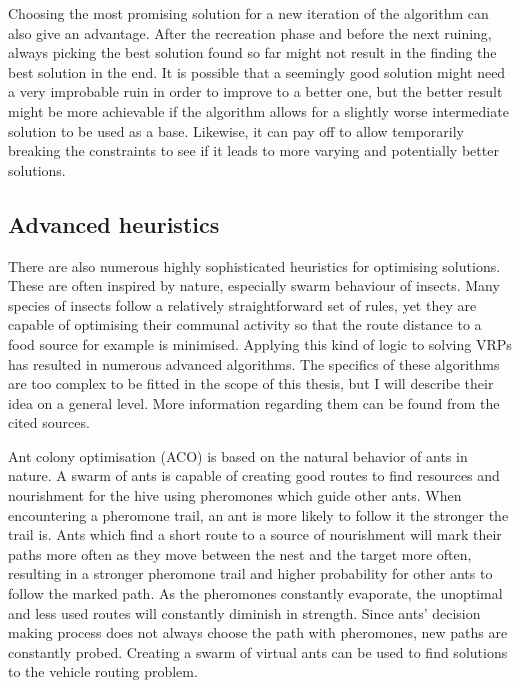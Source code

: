 Choosing the most promising solution for a new iteration of the algorithm can also give an advantage. After the recreation phase and before the next ruining, always picking the best solution found so far might not result in the finding the best solution in the end. It is possible that a seemingly good solution might need a very improbable ruin in order to improve to a better one, but the better result might be more achievable if the algorithm allows for a slightly worse intermediate solution to be used as a base. Likewise, it can pay off to allow temporarily breaking the constraints to see if it leads to more varying and potentially better solutions. \cite{schrimpf2000record}    



\subsection{Advanced heuristics}

There are also numerous highly sophisticated heuristics for optimising solutions. These are often inspired by nature, especially swarm behaviour of insects. Many species of insects follow a relatively straightforward set of rules, yet they are capable of optimising their communal activity so that the route distance to a food source for example is minimised. Applying this kind of logic to solving VRPs has resulted in numerous advanced algorithms. The specifics of these algorithms are too complex to be fitted in the scope of this thesis, but I will describe their idea on a general level. More information regarding them can be found from the cited sources. \cite{karaboga2014comprehensive}

Ant colony optimisation (ACO) is based on the natural behavior of ants in nature. A swarm of ants is capable of creating good routes to find resources and nourishment for the hive using pheromones which guide other ants. When encountering a pheromone trail, an ant is more likely to follow it the stronger the trail is. Ants which find a short route to a source of nourishment will mark their paths more often as they move between the nest and the target more often, resulting in a stronger pheromone trail and higher probability for other ants to follow the marked path. As the pheromones constantly evaporate, the unoptimal and less used routes will constantly diminish in strength. Since ants' decision making process does not always choose the path with pheromones, new paths are constantly probed. Creating a swarm of virtual ants can be used to find solutions to the vehicle routing problem. \cite{bell2004ant} 

